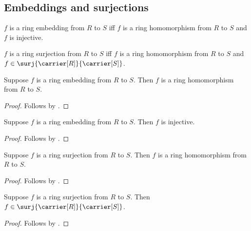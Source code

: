 \subsection{Embeddings and surjections}

\begin{definition}\label{ring_embedding}
    $f$ is a ring embedding from $R$ to $S$ iff
        $f$ is a ring homomorphism from $R$ to $S$ and
        $f$ is injective.
\end{definition}

\begin{definition}\label{ring_surjection}
    $f$ is a ring surjection from $R$ to $S$ iff
        $f$ is a ring homomorphism from $R$ to $S$ and
        $f\in\surj{\carrier[R]}{\carrier[S]}$.
\end{definition}

\begin{proposition}\label{ring_embedding_is_hom}
    Suppose $f$ is a ring embedding from $R$ to $S$.
    Then $f$ is a ring homomorphism from $R$ to $S$.
\end{proposition}
\begin{proof}
    Follows by .
\end{proof}

\begin{proposition}\label{ring_embedding_injective}
    Suppose $f$ is a ring embedding from $R$ to $S$.
    Then $f$ is injective.
\end{proposition}
\begin{proof}
    Follows by .
\end{proof}

\begin{proposition}\label{ring_surjection_is_hom}
    Suppose $f$ is a ring surjection from $R$ to $S$.
    Then $f$ is a ring homomorphism from $R$ to $S$.
\end{proposition}
\begin{proof}
    Follows by .
\end{proof}

\begin{proposition}\label{ring_surjection_is_surjection}
    Suppose $f$ is a ring surjection from $R$ to $S$.
    Then $f\in\surj{\carrier[R]}{\carrier[S]}$.
\end{proposition}
\begin{proof}
    Follows by .
\end{proof}

